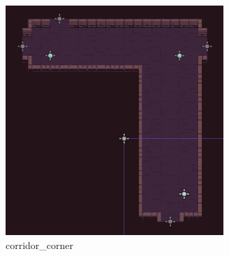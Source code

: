 \documentclass{article}
\begin{document}
\begin{multicols}{3}
\begin{figure}[H]
                \includegraphics[width = 0.9\columnwidth]{images/development/Corridor_3.PNG}
                \caption{corridor\_corner}
        \end{figure}
        \end{multicols}
        \newpage
\end{document}
